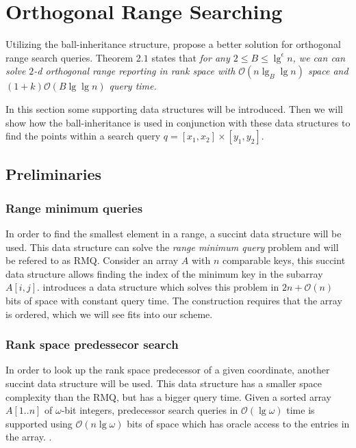 \section{Orthogonal Range Searching}
\label{sect:original}
Utilizing the ball-inheritance structure, \citet{chanetal} propose a better solution for orthogonal range search queries. Theorem $2.1$ states that \emph{for any $2 \leq B \leq \lg^\epsilon n$, we can can solve $2$-d orthogonal range reporting in rank space with $\mathcal{O}(n \lg_B \lg n)$ space and $(1+k)\mathcal{O}(B \lg \lg n)$ query time.}

In this section some supporting data structures will be introduced. Then we will show how the ball-inheritance is used in conjunction with these data structures to find the points within a search query $q = [x_1, x_2] \times [y_1, y_2]$.

\subsection{Preliminaries}

\subsubsection{Range minimum queries}
In order to find the smallest element in a range, a succint data structure will be used. This data structure can solve the \emph{range minimum query} problem and will be refered to as RMQ. 
Consider an array $A$ with $n$ comparable keys, this succint data structure allows finding the index of the minimum key in the subarray $A[i,j]$. \citet{fischer} introduces a data structure which solves this problem in $2n + \mathcal{O}(n)$ bits of space with constant query time. The construction requires that the array is ordered, which we will see fits into our scheme.

\subsubsection{Rank space predessecor search}
In order to look up the rank space predecessor of a given coordinate, another succint data structure will be used. This data structure has a smaller space complexity than the RMQ, but has a bigger query time.
Given a sorted array $A[1..n]$ of $\omega$-bit integers, predecessor search queries in $\mathcal{O}(\lg \omega)$ time is supported using $\mathcal{O}(n \lg \omega)$ bits of space which has oracle access to the entries in the array. . 

